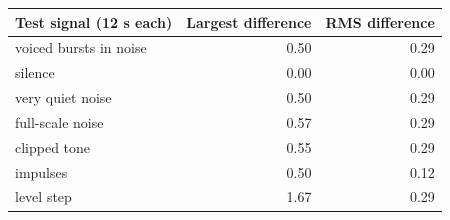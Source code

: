 \begin{tabular}{lrr}
\hline
\rowcolor{headfill} \textbf{Test signal (12 s each)} & \textbf{Largest difference} & \textbf{RMS difference} \\ \hline
voiced bursts in noise & 0.50 & 0.29 \\ \hline
silence & 0.00 & 0.00 \\ \hline
very quiet noise & 0.50 & 0.29 \\ \hline
full-scale noise & 0.57 & 0.29 \\ \hline
clipped tone & 0.55 & 0.29 \\ \hline
impulses & 0.50 & 0.12 \\ \hline
level step & 1.67 & 0.29 \\ \hline
\end{tabular}
